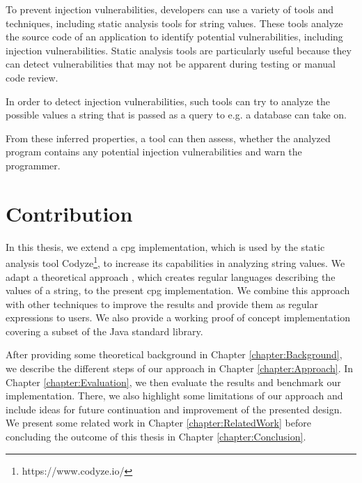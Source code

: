 To prevent injection vulnerabilities, developers can use a variety of tools and techniques, including static analysis tools for string values. These tools analyze the source code of an application to identify potential vulnerabilities, including injection vulnerabilities. Static analysis tools are particularly useful because they can detect vulnerabilities that may not be apparent during testing or manual code review.

In order to detect injection vulnerabilities, such tools can try to analyze the possible values a string that is passed as a query to e.g. a database can take on.

From these inferred properties, a tool can then assess, whether the analyzed program contains any potential injection vulnerabilities and warn the programmer.

\section{Contribution}

In this thesis, we extend a \acf{cpg} implementation, which is used by the static analysis tool Codyze\footnote{https://www.codyze.io/}, to increase its capabilities in analyzing string values. We adapt a theoretical approach \cite{brics}, which creates regular languages describing the values of a string, to the present \ac{cpg} implementation. We combine this approach with other techniques \cite{delgado}\cite{nederhof} to improve the results and provide them as regular expressions to users. We also provide a working proof of concept implementation covering a subset of the Java standard library.

After providing some theoretical background in Chapter \ref{chapter:Background}, we describe the different steps of our approach in Chapter \ref{chapter:Approach}.
In Chapter \ref{chapter:Evaluation}, we then evaluate the results and benchmark our implementation. There, we also highlight some limitations of our approach and include ideas for future continuation and improvement of the presented design. We present some related work in Chapter \ref{chapter:RelatedWork} before concluding the outcome of this thesis in Chapter \ref{chapter:Conclusion}.
